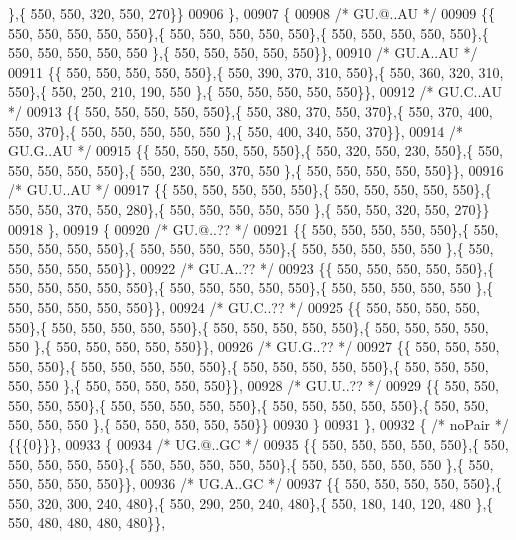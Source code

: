 \begin{DoxyCode}
      \},\{ 550, 550, 320, 550, 270\}\}
00906 \},
00907 \{
00908 \textcolor{comment}{/* GU.@..AU */}
00909 \{\{ 550, 550, 550, 550, 550\},\{ 550, 550, 550, 550, 550\},\{ 550, 550, 550, 550, 550\},\{ 550, 550, 550, 550, 550
      \},\{ 550, 550, 550, 550, 550\}\},
00910 \textcolor{comment}{/* GU.A..AU */}
00911 \{\{ 550, 550, 550, 550, 550\},\{ 550, 390, 370, 310, 550\},\{ 550, 360, 320, 310, 550\},\{ 550, 250, 210, 190, 550
      \},\{ 550, 550, 550, 550, 550\}\},
00912 \textcolor{comment}{/* GU.C..AU */}
00913 \{\{ 550, 550, 550, 550, 550\},\{ 550, 380, 370, 550, 370\},\{ 550, 370, 400, 550, 370\},\{ 550, 550, 550, 550, 550
      \},\{ 550, 400, 340, 550, 370\}\},
00914 \textcolor{comment}{/* GU.G..AU */}
00915 \{\{ 550, 550, 550, 550, 550\},\{ 550, 320, 550, 230, 550\},\{ 550, 550, 550, 550, 550\},\{ 550, 230, 550, 370, 550
      \},\{ 550, 550, 550, 550, 550\}\},
00916 \textcolor{comment}{/* GU.U..AU */}
00917 \{\{ 550, 550, 550, 550, 550\},\{ 550, 550, 550, 550, 550\},\{ 550, 550, 370, 550, 280\},\{ 550, 550, 550, 550, 550
      \},\{ 550, 550, 320, 550, 270\}\}
00918 \},
00919 \{
00920 \textcolor{comment}{/* GU.@..?? */}
00921 \{\{ 550, 550, 550, 550, 550\},\{ 550, 550, 550, 550, 550\},\{ 550, 550, 550, 550, 550\},\{ 550, 550, 550, 550, 550
      \},\{ 550, 550, 550, 550, 550\}\},
00922 \textcolor{comment}{/* GU.A..?? */}
00923 \{\{ 550, 550, 550, 550, 550\},\{ 550, 550, 550, 550, 550\},\{ 550, 550, 550, 550, 550\},\{ 550, 550, 550, 550, 550
      \},\{ 550, 550, 550, 550, 550\}\},
00924 \textcolor{comment}{/* GU.C..?? */}
00925 \{\{ 550, 550, 550, 550, 550\},\{ 550, 550, 550, 550, 550\},\{ 550, 550, 550, 550, 550\},\{ 550, 550, 550, 550, 550
      \},\{ 550, 550, 550, 550, 550\}\},
00926 \textcolor{comment}{/* GU.G..?? */}
00927 \{\{ 550, 550, 550, 550, 550\},\{ 550, 550, 550, 550, 550\},\{ 550, 550, 550, 550, 550\},\{ 550, 550, 550, 550, 550
      \},\{ 550, 550, 550, 550, 550\}\},
00928 \textcolor{comment}{/* GU.U..?? */}
00929 \{\{ 550, 550, 550, 550, 550\},\{ 550, 550, 550, 550, 550\},\{ 550, 550, 550, 550, 550\},\{ 550, 550, 550, 550, 550
      \},\{ 550, 550, 550, 550, 550\}\}
00930 \}
00931 \},
00932 \{ \textcolor{comment}{/* noPair */} \{\{\{0\}\}\},
00933 \{
00934 \textcolor{comment}{/* UG.@..GC */}
00935 \{\{ 550, 550, 550, 550, 550\},\{ 550, 550, 550, 550, 550\},\{ 550, 550, 550, 550, 550\},\{ 550, 550, 550, 550, 550
      \},\{ 550, 550, 550, 550, 550\}\},
00936 \textcolor{comment}{/* UG.A..GC */}
00937 \{\{ 550, 550, 550, 550, 550\},\{ 550, 320, 300, 240, 480\},\{ 550, 290, 250, 240, 480\},\{ 550, 180, 140, 120, 480
      \},\{ 550, 480, 480, 480, 480\}\},

\end{DoxyCode}
